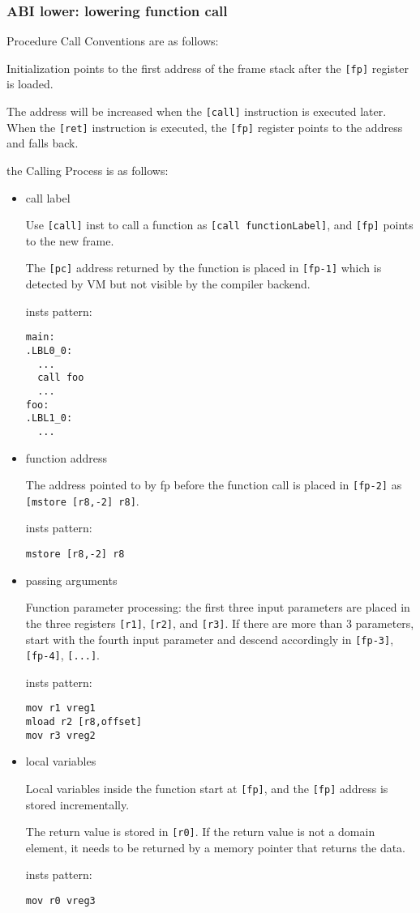 \subsubsection{ABI lower: lowering function call}
    
Procedure Call Conventions are as follows:

Initialization points to the first address of the frame stack after the \texttt{[fp]} register is loaded.
    
The address will be increased when the \texttt{[call]}  instruction is executed later. When the \texttt{[ret]} instruction is executed, the \texttt{[fp]} register points to the address and falls back.
    
    
the Calling Process is as follows:
\begin{itemize}
    \item call label

Use  \texttt{[call]} inst to call a function as \texttt{[call functionLabel]}, and \texttt{[fp]} points to the new frame.\par
The \texttt{[pc]} address returned by the function is placed in \texttt{[fp-1]} which is detected by VM but not visible by the compiler backend.\par
insts pattern:
\begin{lstlisting}[language={}]
main:
.LBL0_0:
  ...
  call foo
  ...
foo:
.LBL1_0:
  ...
\end{lstlisting}
    \item function address

The address pointed to by fp before the function call is placed in  \texttt{[fp-2]} as \texttt{[mstore [r8,-2] r8]}.\par
insts pattern:
\begin{lstlisting}[language={}]
mstore [r8,-2] r8
\end{lstlisting}
    \item passing arguments

Function parameter processing: the first three input parameters are placed in the three registers \texttt{[r1]}, \texttt{[r2]}, and \texttt{[r3]}.
If there are more than 3 parameters, start with the fourth input parameter and descend accordingly in \texttt{[fp-3]}, \texttt{[fp-4]}, \texttt{[...]}. \par
insts pattern:
\begin{lstlisting}[language={}]
mov r1 vreg1
mload r2 [r8,offset]
mov r3 vreg2
\end{lstlisting}
    \item  local variables

Local variables inside the function start at \texttt{[fp]}, and the \texttt{[fp]} address is stored incrementally. 

The return value is stored in \texttt{[r0]}. If the return value is not a domain element, it needs to be returned by a memory pointer that returns the data.\par
insts pattern:
\begin{lstlisting}[language={}]
mov r0 vreg3
\end{lstlisting}
\end{itemize}

